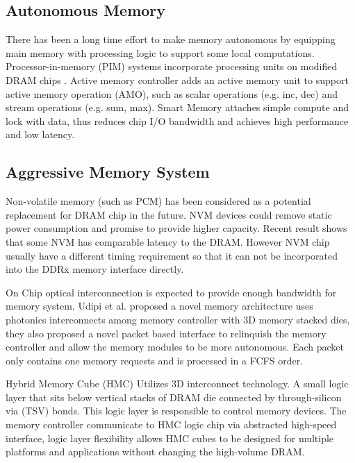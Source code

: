 \documentclass[pageno]{jpaper}
\begin{document}
\subsection	{Autonomous Memory}

There has been a long time effort to make memory autonomous by equipping main memory with processing logic to support some local computations. Processor-in-memory (PIM) systems incorporate processing units on modified DRAM chips \cite{PIMArch,PIMDataArch}. Active memory controller \cite{AMController,AMOperations} adds an active memory unit to support active memory operation (AMO), such as scalar operations (e.g. inc, dec) and stream operations (e.g. sum, max). Smart Memory \cite{HuaweiSmartMemory} attaches simple compute and lock with data, thus reduces chip I/O bandwidth and achieves high performance and low latency.

\subsection	{Aggressive Memory System}

Non-volatile memory (such as PCM) \cite{PCMArch,HybridPCMIBM,PCMMemoryPitt,Hybrid3DPCM} has been considered as a potential replacement for DRAM chip in the future. NVM devices could remove static power consumption and promise to provide higher capacity. Recent result shows that some NVM has comparable latency to the DRAM. However NVM chip usually have a different timing requirement so that it can not be incorporated into the DDRx memory interface directly.

On Chip optical interconnection is expected to provide enough bandwidth for memory system. Udipi et al. \cite{PacketMemory} proposed a novel memory architecture uses photonics interconnects among memory controller with 3D memory stacked dies, they also proposed a novel packet based interface to relinquish the memory controller and allow the memory modules to be more autonomous. Each packet only contains one memory requests and is processed in a FCFS order.

Hybrid Memory Cube (HMC) \cite{HMC} Utilizes 3D interconnect technology. A small logic layer that sits below vertical stacks of DRAM die connected by through-silicon via (TSV) bonds. This logic layer is responsible to control memory devices. The memory controller communicate to HMC logic chip via abstracted high-speed interface, logic layer flexibility allows HMC cubes to be designed for multiple platforms and applications without changing the high-volume DRAM.
\end{document}

